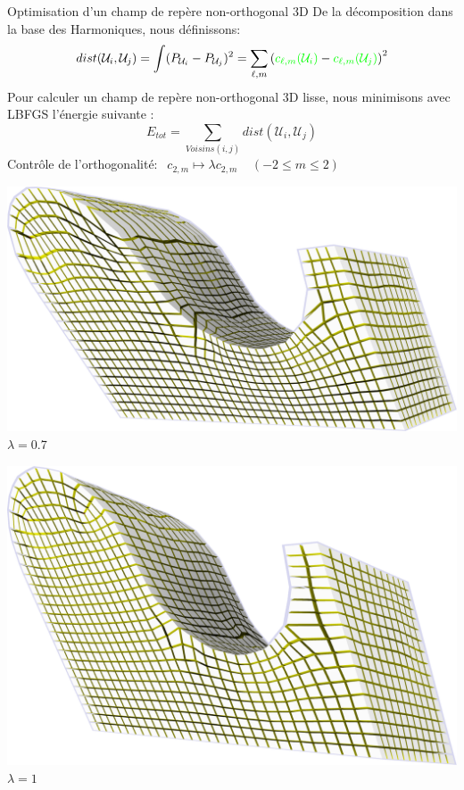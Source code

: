 \documentclass{beamer}
\begin{document}
\begin{frame}{Optimisation d'un champ de repère non-orthogonal 3D}
    \centering
    \footnotesize
     De la décomposition dans la base des Harmoniques, nous définissons:
    $$ dist(\mathcal{U}_i, \mathcal{U}_j) = \int (P_{\mathcal{U}_i} - P_{\mathcal{U}_j})^2 = \sum_{\ell, m} \left({\color{green}c_{\ell,m}(\mathcal{U}_i)} - {\color{green}c_{\ell,m}(\mathcal{U}_j)} \right)^2$$
    Pour calculer un champ de repère non-orthogonal 3D lisse, nous minimisons avec LBFGS l'énergie suivante :
    $$ E_{tot} = \sum_{Voisins(i, j)} dist(\mathcal{U}_i, \mathcal{U}_j)$$
    Contrôle de l'orthogonalité: $\ \ c_{2,m} \mapsto \lambda c_{2,m} \ \ \ \ \ (-2 \leq m \leq 2)$ %
    
    \begin{minipage}[b]{0.33\textwidth}
        \centering
        \includegraphics[width=\textwidth]{img_spm_ff/shear_0_7.png}
        $\lambda = 0.7$
    \end{minipage}
    \begin{minipage}[b]{0.28\textwidth}
        \centering
        \includegraphics[width=\textwidth]{img_spm_ff/shear_1.png}
        $\lambda = 1$
    \end{minipage}
    
    \normalsize
\end{frame} 
\end{document}
